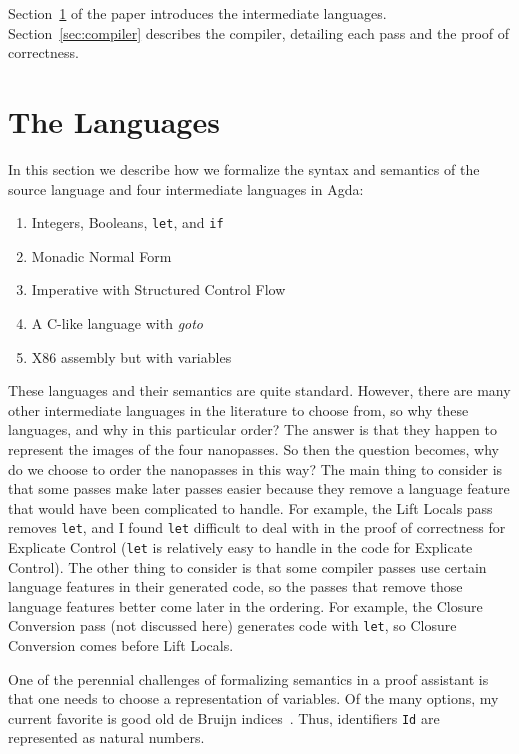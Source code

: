 \documentclass[sigplan,review,dvipsnames,screen,10pt]{acmart}
\begin{document}
Section~\ref{sec:langs} of the paper introduces the intermediate
languages. Section~\ref{sec:compiler} describes the compiler,
detailing each pass and the proof of correctness.

\section{The Languages}
\label{sec:langs}

In this section we describe how we formalize the syntax and semantics
of the source language and four intermediate languages in Agda:
\begin{enumerate}
\item Integers, Booleans, \texttt{let}, and \texttt{if}
\item Monadic Normal Form
\item Imperative with Structured Control Flow
\item A C-like language with \emph{goto}
\item X86 assembly but with variables
\end{enumerate}
These languages and their semantics are quite standard. However, there
are many other intermediate languages in the literature to choose
from, so why these languages, and why in this particular order?  The
answer is that they happen to represent the images of the four
nanopasses.  So then the question becomes, why do we choose to order
the nanopasses in this way? The main thing to consider is that some
passes make later passes easier because they remove a language feature
that would have been complicated to handle. For example, the Lift
Locals pass removes \texttt{let}, and I found \texttt{let} difficult
to deal with in the proof of correctness for Explicate Control
(\texttt{let} is relatively easy to handle in the code for Explicate
Control). The other thing to consider is that some compiler passes use
certain language features in their generated code, so the passes that
remove those language features better come later in the ordering.  For
example, the Closure Conversion pass (not discussed here) generates
code with \texttt{let}, so Closure Conversion comes before Lift
Locals.

One of the perennial challenges of formalizing semantics in a proof
assistant is that one needs to choose a representation of variables.
Of the many options, my current favorite is good old de Bruijn
indices~\citep{Bruijn:1972kx}.  Thus, identifiers \lstinline{Id} are
represented as natural numbers.
\end{document}
